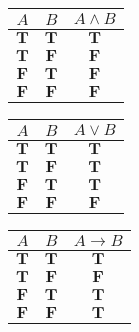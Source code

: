 \documentclass[preview]{standalone}
\begin{document}
   \begin{center}
   \begin{tabular} {|c|c||c|}
   \hline
   $A$      & $B$      & $A \wedge B$ \\ \hline
   $\mathbf{T}$  & $\mathbf{T}$  & $\mathbf{T}$      \\ \hline
   $\mathbf{T}$  & $\mathbf{F}$ & $\mathbf{F}$     \\ \hline
   $\mathbf{F}$ & $\mathbf{T}$  & $\mathbf{F}$     \\ \hline
   $\mathbf{F}$ & $\mathbf{F}$ & $\mathbf{F}$     \\ \hline
   \end{tabular}
   \quad
   \begin{tabular} {|c|c||c|}
   \hline
   $A$      & $B$      & $A \vee B$ \\ \hline
   $\mathbf{T}$  & $\mathbf{T}$  & $\mathbf{T}$      \\ \hline
   $\mathbf{T}$  & $\mathbf{F}$ & $\mathbf{T}$      \\ \hline
   $\mathbf{F}$ & $\mathbf{T}$  & $\mathbf{T}$      \\ \hline
   $\mathbf{F}$ & $\mathbf{F}$ & $\mathbf{F}$     \\ \hline
   \end{tabular}
   \quad
   \begin{tabular} {|c|c||c|}
   \hline
   $A$      & $B$      & $A \to B$ \\ \hline
   $\mathbf{T}$  & $\mathbf{T}$  & $\mathbf{T}$      \\ \hline
   $\mathbf{T}$  & $\mathbf{F}$ & $\mathbf{F}$     \\ \hline
   $\mathbf{F}$ & $\mathbf{T}$  & $\mathbf{T}$      \\ \hline
   $\mathbf{F}$ & $\mathbf{F}$ & $\mathbf{T}$      \\ \hline
   \end{tabular}
   \end{center}
\end{document}
